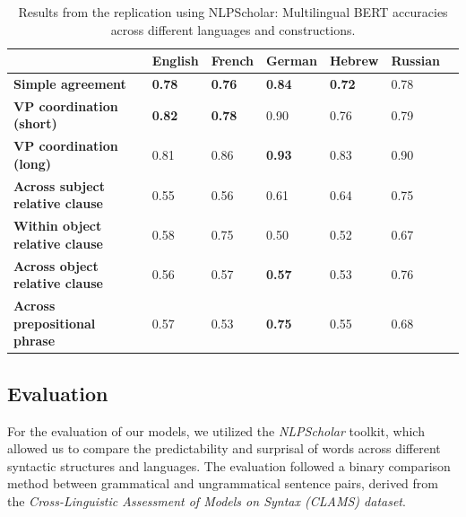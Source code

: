 \documentclass[11pt]{article}
\begin{document}
\begin{table}[htbp]
\centering
\caption{Results from the replication using NLPScholar: Multilingual BERT accuracies across different languages and constructions.}
\begin{tabularx}{\textwidth}{@{}lXXXXXX@{}}
\toprule
                        & \textbf{English} & \textbf{French} & \textbf{German} & \textbf{Hebrew} & \textbf{Russian} \\ \midrule
\textbf{Simple agreement}                & \textbf{0.78}    & \textbf{0.76}   & \textbf{0.84}   & \textbf{0.72}    & 0.78            \\
\textbf{VP coordination (short)}         & \textbf{0.82}    & \textbf{0.78}   & 0.90            & 0.76           & 0.79            \\
\textbf{VP coordination (long)}          & 0.81             & 0.86            & \textbf{0.93}   & 0.83             & 0.90             \\
\textbf{Across subject relative clause}  & 0.55             & 0.56            & 0.61            & 0.64            & 0.75            \\
\textbf{Within object relative clause}   & 0.58             & 0.75            & 0.50            & 0.52           & 0.67             \\
\textbf{Across object relative clause}   & 0.56             & 0.57            & \textbf{0.57}   & 0.53           & 0.76            \\
\textbf{Across prepositional phrase}     & 0.57             & 0.53            & \textbf{0.75}   & 0.55           & 0.68            \\ \bottomrule
\end{tabularx}
\label{tab:Table2}
\end{table}


\subsection{Evaluation}

For the evaluation of our models, we utilized the \textit{NLPScholar} toolkit, which allowed us to compare the predictability and surprisal of words across different syntactic structures and languages. The evaluation followed a binary comparison method between grammatical and ungrammatical sentence pairs, derived from the \textit{Cross-Linguistic Assessment of Models on Syntax (CLAMS) dataset}.
\end{document}
